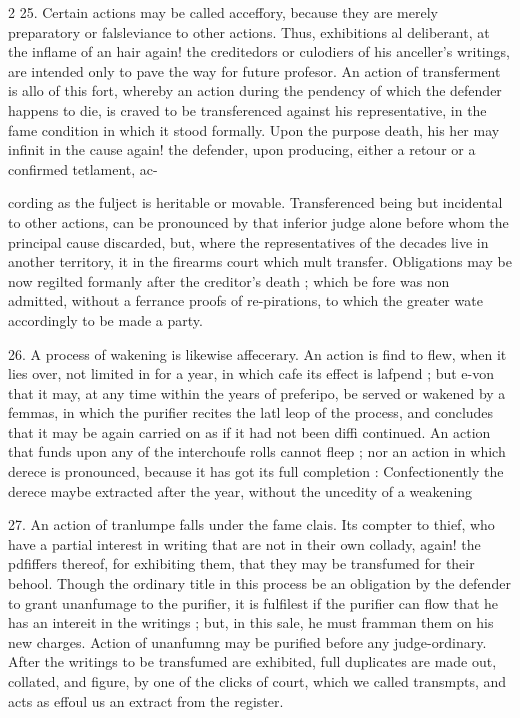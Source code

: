 \documentclass[10pt]{article}
\begin{document}
\begin{multicols}{2}
25. Certain actions may be called acceffory, because they are merely preparatory or falsleviance to other actions. Thus, exhibitions al deliberant, at the inflame of an hair again! the creditedors or culodiers of his anceller's writings, are intended only to pave the way for future profesor. An action of transferment is allo of this fort, whereby an action during the pendency of which the defender happens to die, is craved to be transferenced against his representative, in the fame condition in which it stood formally. Upon the purpose death, his her may infinit in the cause again! the defender, upon producing, either a retour or a confirmed tetlament, ac-

cording as the fulject is heritable or movable. Transferenced being but incidental to other actions, can be pronounced by that inferior judge alone before whom the principal cause discarded, but, where the representatives of the decades live in another territory, it in the firearms court which mult transfer. Obligations may be now regilted formanly after the creditor's death ; which be fore was non admitted, without a ferrance proofs of re-pirations, to which the greater wate accordingly to be made a party.

26. A process of wakening is likewise affecerary. An action is find to flew, when it lies over, not limited in for a year, in which cafe its effect is lafpend ; but e-von that it may, at any time within the years of preferipo, be served or wakened by a femmas, in which the purifier recites the latl leop of the process, and concludes that it may be again carried on as if it had not been diffi continued. An action that funds upon any of the interchoufe rolls cannot fleep ; nor an action in which derece is pronounced, because it has got its full completion : Confectionently the derece maybe extracted after the year, without the uncedity of a weakening

27. An action of tranlumpe falls under the fame clais. Its compter to thief, who have a partial interest in writing that are not in their own collady, again! the pdfiffers thereof, for exhibiting them, that they may be transfumed for their behool. Though the ordinary title in this process be an obligation by the defender to grant unanfumage to the purifier, it is fulfilest if the purifier can flow that he has an intereit in the writings ; but, in this sale, he must framman them on his new charges. Action of unanfumng may be purified before any judge-ordinary. After the writings to be transfumed are exhibited, full duplicates are made out, collated, and figure, by one of the clicks of court, which we called transmpts, and acts as effoul us an extract from the register.


\end{multicols}
\end{document}
